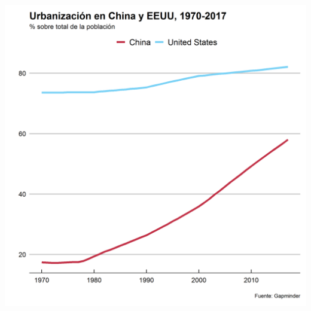 \documentclass{beamer}
\begin{document}
	\begin{frame}[plain]
		\centering
		\includegraphics[width=.8\linewidth, keepaspectratio]{urban_70}
	\end{frame}
\end{document}
